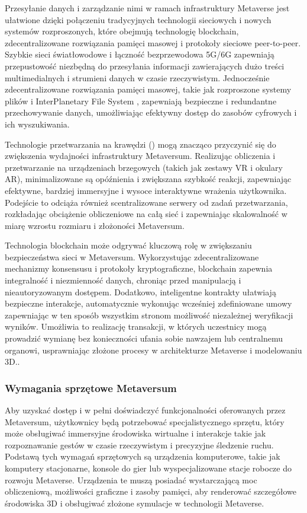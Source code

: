 Przesyłanie danych i zarządzanie nimi w ramach infrastruktury Metaverse jest ułatwione dzięki połączeniu tradycyjnych technologii sieciowych i nowych systemów rozproszonych, które obejmują technologię blockchain, zdecentralizowane rozwiązania pamięci masowej i protokoły sieciowe peer-to-peer. Szybkie sieci światłowodowe i łączność bezprzewodowa 5G/6G zapewniają przepustowość niezbędną do przesyłania informacji zawierających dużo treści multimedialnych i strumieni danych w czasie rzeczywistym. Jednocześnie zdecentralizowane rozwiązania pamięci masowej, takie jak rozproszone systemy plików i InterPlanetary File System , zapewniają bezpieczne i redundantne przechowywanie danych, umożliwiając efektywny dostęp do zasobów cyfrowych i ich wyszukiwania\cite{metaverseInfrastructureIEEE}.

Technologie przetwarzania na krawędzi () mogą znacząco przyczynić się do zwiększenia wydajności infrastruktury Metaversum. Realizując obliczenia i przetwarzanie na urządzeniach brzegowych (takich jak zestawy VR i okulary AR), minimalizowane są opóźnienia i zwiększana szybkość reakcji, zapewniając efektywne, bardziej immersyjne i wysoce interaktywne wrażenia użytkownika. Podejście to odciąża również scentralizowane serwery od zadań przetwarzania, rozkładając obciążenie obliczeniowe na całą sieć i zapewniając skalowalność w miarę wzrostu rozmiaru i złożoności Metaversum\cite{metaverseInfrastructureIEEE}.

Technologia blockchain może odgrywać kluczową rolę w zwiększaniu bezpieczeństwa sieci w Metaversum. Wykorzystując zdecentralizowane mechanizmy konsensusu i protokoły kryptograficzne, blockchain zapewnia integralność i niezmienność danych, chroniąc przed manipulacją i nieautoryzowanym dostępem. Dodatkowo, inteligentne kontrakty ułatwiają bezpieczne interakcje, automatycznie wykonując wcześniej zdefiniowane umowy zapewniając w ten sposób wszystkim stronom możliwość niezależnej weryfikacji wyników. Umożliwia to realizację transakcji, w których uczestnicy mogą prowadzić wymianę bez konieczności ufania sobie nawzajem lub centralnemu organowi, usprawniając złożone procesy w architekturze Metaverse i modelowaniu 3D.\cite{metaverseInfrastructureIEEE}.

\subsubsection{Wymagania sprzętowe Metaversum}

Aby uzyskać dostęp i w pełni doświadczyć funkcjonalności oferowanych przez Metaversum, użytkownicy będą potrzebować specjalistycznego sprzętu, który może obsługiwać immersyjne środowiska wirtualne i interakcje takie jak rozpoznawanie gestów w czasie rzeczywistym i precyzyjne śledzenie ruchu. Podstawą tych wymagań sprzętowych są urządzenia komputerowe, takie jak komputery stacjonarne, konsole do gier lub wyspecjalizowane stacje robocze do rozwoju Metaverse. Urządzenia te muszą posiadać wystarczającą moc obliczeniową, możliwości graficzne i zasoby pamięci, aby renderować szczegółowe środowiska 3D i obsługiwać złożone symulacje w technologii Metaverse\cite{metaverseInfrastructureIEEE}.

